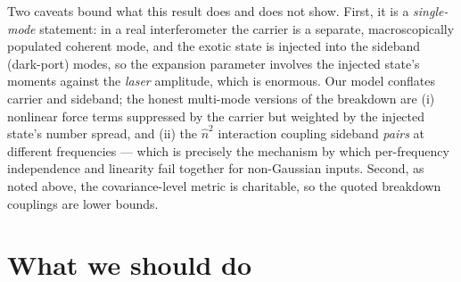 \documentclass[11pt]{article}
\begin{document}
Two caveats bound what this result does and does not show. First, it is a
\emph{single-mode} statement: in a real interferometer the carrier is a
separate, macroscopically populated coherent mode, and the exotic state is
injected into the sideband (dark-port) modes, so the expansion parameter
involves the injected state's moments against the \emph{laser} amplitude,
which is enormous. Our model conflates carrier and sideband; the honest
multi-mode versions of the breakdown are (i) nonlinear force terms
suppressed by the carrier but weighted by the injected state's number
spread, and (ii) the $\hat n^{2}$ interaction coupling sideband
\emph{pairs} at different frequencies --- which is precisely the mechanism
by which per-frequency independence and linearity fail together for
non-Gaussian inputs. Second, as noted above, the covariance-level metric
is charitable, so the quoted breakdown couplings are lower bounds.

\section{What we should do}
\end{document}
